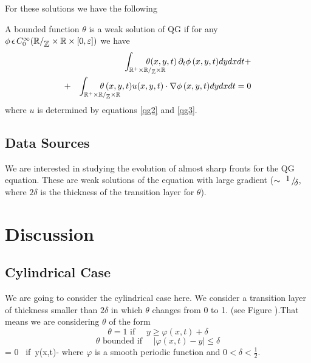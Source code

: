 \documentclass{pnastwo}
\begin{document}
\begin{article}
For these solutions we have the following

\begin{definition}
A bounded function $\theta$ is a weak solution of QG if for any
$\phi\,\epsilon\,
C_0^{\infty}(\mathbb{R}/_{\displaystyle{ \mathbb{Z}}}\times\mathbb{R}\times[0,\varepsilon])$ we have
\begin{eqnarray}
&&  \int_{\mathbb{R}^+\times\fd\times\mathbb{R}} \hspace{-25pt}
 \theta(x,y,t)\, \pr_t \phi
\,(x,y,t) dy dx dt+\nonumber\\
  & +&\int_{\mathbb{R}^+\times\fd\times\mathbb{R}}
\hspace{-26pt} \theta\,(x,y,t) u(x,y,t)\cdot\nabla\phi\,(x,y,t)
dydxdt = 0 \label{weaksol} \end{eqnarray}
where $u$ is determined by equations \eqref{qg2} and \eqref{qg3}.
\end{definition}

\subsection{Data Sources}
We are interested in studying the evolution of almost sharp fronts
for the QG equation. These are weak solutions of the equation with
large gradient ($\sim \displaystyle{ \inlinefrac{1}{\delta}}$, where $2
\delta$ is the thickness of the transition layer for $\theta$).

\section{Discussion}
\subsection{Cylindrical Case}
We are going to consider the cylindrical case here. We consider a
transition layer of thickness smaller than $2\delta$ in which
 $\theta$ changes from 0 to 1. (see Figure ).That means we are considering $\theta$  of the form
\[
\theta  = 1   \mbox{ if }\quad  y\geq \varphi(x,t)+\delta
\]
\[
\theta \mbox{ bounded} \mbox{ if }\quad |\varphi(x,t)-y|\leq\delta
\]
\be \theta = 0  \mbox{ if }\quad  y\leq \varphi(x,t)-\delta
\label{theta} \ee
where $\varphi$ is a smooth periodic function and
$0<\delta<\frac{1}{2}$.



\end{article}
\end{document}
